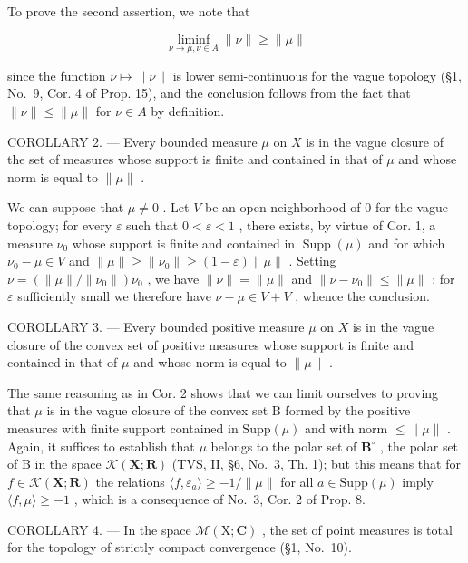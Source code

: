 To prove the second assertion, we note that

\[
\liminf _ {\nu \to \mu ,   \nu \in A} \| \nu \| \geqslant \| \mu \|
\]

since the function \(\nu \mapsto \| \nu \|\) is lower semi-continuous for the vague topology (§1, No.~9, Cor. 4 of Prop. 15), and the conclusion follows from the fact that \(\| \nu \| \leqslant \| \mu \|\) for \(\nu \in A\) by definition.

COROLLARY 2. --- Every bounded measure \(\mu\) on \(X\) is in the vague closure of the set of measures whose support is finite and contained in that of \(\mu\) and whose norm is equal to \(\|\mu\|\) .

We can suppose that \(\mu \neq 0\) . Let \(V\) be an open neighborhood of 0 for the vague topology; for every \(\varepsilon\) such that \(0 < \varepsilon < 1\) , there exists, by virtue of Cor. 1, a measure \(\nu_0\) whose support is finite and contained in \(\operatorname{Supp}(\mu)\) and for which \(\nu_0 - \mu \in V\) and \(\| \mu \| \geqslant \| \nu_0 \| \geqslant (1 - \varepsilon) \| \mu \|\) . Setting \(\nu = (\| \mu \| / \| \nu_0 \|) \nu_0\) , we have \(\| \nu \| = \| \mu \|\) and \(\| \nu - \nu_0 \| \leqslant \| \mu \|\) ; for \(\varepsilon\) sufficiently small we therefore have \(\nu - \mu \in V + V\) , whence the conclusion.

COROLLARY 3. --- Every bounded positive measure \(\mu\) on \(X\) is in the vague closure of the convex set of positive measures whose support is finite and contained in that of \(\mu\) and whose norm is equal to \(\|\mu\|\) .

The same reasoning as in Cor. 2 shows that we can limit ourselves to proving that \(\mu\) is in the vague closure of the convex set B formed by the positive measures with finite support contained in \(\mathrm{Supp}(\mu)\) and with norm \(\leqslant \| \mu \|\) . Again, it suffices to establish that \(\mu\) belongs to the polar set of \(\mathbf{B}^{\circ}\) , the polar set of B in the space \(\mathcal{K}(\mathbf{X};\mathbf{R})\) (TVS, II, §6, No.~3, Th. 1); but this means that for \(f\in \mathcal{K}(\mathbf{X};\mathbf{R})\) the relations \(\langle f,\varepsilon_a\rangle \geqslant -1 / \| \mu \|\) for all \(a\in \mathrm{Supp}(\mu)\) imply \(\langle f,\mu \rangle \geqslant -1\) , which is a consequence of No.~3, Cor. 2 of Prop. 8.

COROLLARY 4. --- In the space \(\mathcal{M}(\mathrm{X};\mathbf{C})\) , the set of point measures is total for the topology of strictly compact convergence (§1, No.~10).

